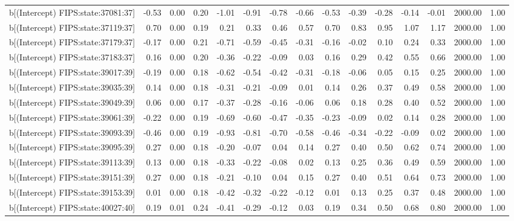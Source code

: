 \begin{table}[ht]
\begin{tabular}{rrrrrrrrrrrrrrr}
  b[(Intercept) FIPS:state:37081:37] & -0.53 & 0.00 & 0.20 & -1.01 & -0.91 & -0.78 & -0.66 & -0.53 & -0.39 & -0.28 & -0.14 & -0.01 & 2000.00 & 1.00 \\ 
  b[(Intercept) FIPS:state:37119:37] & 0.70 & 0.00 & 0.19 & 0.21 & 0.33 & 0.46 & 0.57 & 0.70 & 0.83 & 0.95 & 1.07 & 1.17 & 2000.00 & 1.00 \\ 
  b[(Intercept) FIPS:state:37179:37] & -0.17 & 0.00 & 0.21 & -0.71 & -0.59 & -0.45 & -0.31 & -0.16 & -0.02 & 0.10 & 0.24 & 0.33 & 2000.00 & 1.00 \\ 
  b[(Intercept) FIPS:state:37183:37] & 0.16 & 0.00 & 0.20 & -0.36 & -0.22 & -0.09 & 0.03 & 0.16 & 0.29 & 0.42 & 0.55 & 0.66 & 2000.00 & 1.00 \\ 
  b[(Intercept) FIPS:state:39017:39] & -0.19 & 0.00 & 0.18 & -0.62 & -0.54 & -0.42 & -0.31 & -0.18 & -0.06 & 0.05 & 0.15 & 0.25 & 2000.00 & 1.00 \\ 
  b[(Intercept) FIPS:state:39035:39] & 0.14 & 0.00 & 0.18 & -0.31 & -0.21 & -0.09 & 0.01 & 0.14 & 0.26 & 0.37 & 0.49 & 0.58 & 2000.00 & 1.00 \\ 
  b[(Intercept) FIPS:state:39049:39] & 0.06 & 0.00 & 0.17 & -0.37 & -0.28 & -0.16 & -0.06 & 0.06 & 0.18 & 0.28 & 0.40 & 0.52 & 2000.00 & 1.00 \\ 
  b[(Intercept) FIPS:state:39061:39] & -0.22 & 0.00 & 0.19 & -0.69 & -0.60 & -0.47 & -0.35 & -0.23 & -0.09 & 0.02 & 0.14 & 0.28 & 2000.00 & 1.00 \\ 
  b[(Intercept) FIPS:state:39093:39] & -0.46 & 0.00 & 0.19 & -0.93 & -0.81 & -0.70 & -0.58 & -0.46 & -0.34 & -0.22 & -0.09 & 0.02 & 2000.00 & 1.00 \\ 
  b[(Intercept) FIPS:state:39095:39] & 0.27 & 0.00 & 0.18 & -0.20 & -0.07 & 0.04 & 0.14 & 0.27 & 0.40 & 0.50 & 0.62 & 0.74 & 2000.00 & 1.00 \\ 
  b[(Intercept) FIPS:state:39113:39] & 0.13 & 0.00 & 0.18 & -0.33 & -0.22 & -0.08 & 0.02 & 0.13 & 0.25 & 0.36 & 0.49 & 0.59 & 2000.00 & 1.00 \\ 
  b[(Intercept) FIPS:state:39151:39] & 0.27 & 0.00 & 0.18 & -0.21 & -0.10 & 0.04 & 0.15 & 0.27 & 0.40 & 0.51 & 0.64 & 0.73 & 2000.00 & 1.00 \\ 
  b[(Intercept) FIPS:state:39153:39] & 0.01 & 0.00 & 0.18 & -0.42 & -0.32 & -0.22 & -0.12 & 0.01 & 0.13 & 0.25 & 0.37 & 0.48 & 2000.00 & 1.00 \\ 
  b[(Intercept) FIPS:state:40027:40] & 0.19 & 0.01 & 0.24 & -0.41 & -0.29 & -0.12 & 0.03 & 0.19 & 0.34 & 0.50 & 0.68 & 0.80 & 2000.00 & 1.00 \\ 

\end{tabular}
\end{table}

